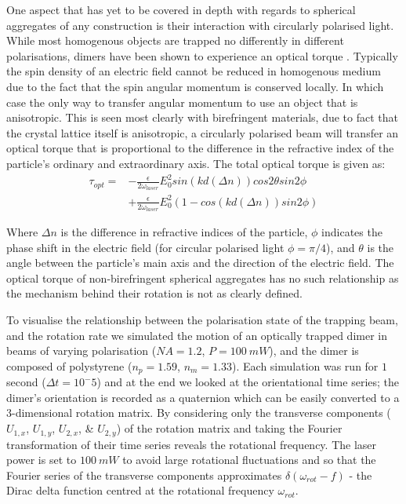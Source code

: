 One aspect that has yet to be covered in depth with regards to
spherical aggregates of any construction is their interaction with
circularly polarised light. While most homogenous objects are trapped
no differently in different polarisations, dimers have been shown to
experience an optical torque \cite{Vigilante2020, Ahn2018, Reimann2018}. 
Typically the spin density of an electric field cannot be reduced in 
homogenous medium due to the fact that the spin angular momentum is 
conserved locally. In which case the only way to transfer angular 
momentum to use an object that is anisotropic. This is seen most 
clearly with birefringent materials, due to fact that the crystal 
lattice itself is anisotropic, a circularly polarised beam will 
transfer an optical torque that is proportional to the difference in 
the refractive index of the particle's ordinary and extraordinary axis. 
The total optical torque is given as:
\begin{equation}
	\label{eq:opt_torque}
	\begin{aligned}
		\tau_{opt} =& -\frac{\epsilon}{2\omega_{laser}}E_0^2sin(kd(\Delta n))cos2\theta sin2\phi \\ &+  \frac{\epsilon}{2\omega_{laser}}E_0^2 (1-cos(kd(\Delta n))sin2\phi)
	\end{aligned}
\end{equation}

Where $\Delta n$ is the difference in refractive indices of the 
particle, $\phi$ indicates the phase shift in the electric field
(for circular polarised light $\phi= \pi/4$), and $\theta$ is the angle
between the particle's main axis and the direction of the electric field.
The optical torque of non-birefringent spherical aggregates has no such 
relationship as the mechanism behind their rotation is not as clearly defined. 

To visualise the relationship between the polarisation state of the 
trapping beam, and the rotation rate we simulated the motion of an 
optically trapped dimer in beams of varying polarisation ($NA=1.2$, 
$P=100\ mW$), and the dimer is composed of polystyrene ($n_p=1.59$, 
$n_m=1.33$). Each simulation was run for $1$ second ($\Delta t 
=10^-5$) and at the end we looked at the orientational time series; 
the dimer's orientation is recorded as a quaternion which can be easily 
converted to a 3-dimensional rotation matrix. By considering only the 
transverse components ($U_{1,x}$, $U_{1,y}$, $U_{2,x}$, \& $U_{2,y}$) 
of the rotation matrix and taking the Fourier transformation of their 
time series reveals the rotational frequency. The laser power is set to 
$100\ mW$ to avoid large rotational fluctuations and so that the Fourier 
series of the transverse components approximates $\delta(\omega_{rot}-f)$ 
- the Dirac delta function centred at the rotational frequency $\omega_{rot}$.

